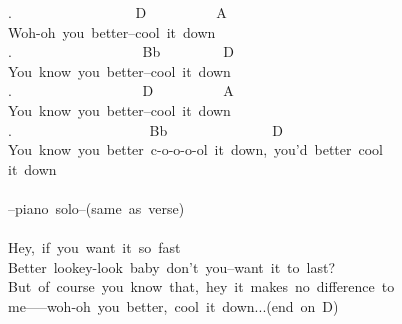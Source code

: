 {. \ \ \ \ \ \ \ \ \ \ \ \ \ \ \ \ \ D\ \ \ \ \ \ \ \ \ \ A\\
Woh-oh\ you\ better--cool\ it\ down\\
. \ \ \ \ \ \ \ \ \ \ \ \ \ \ \ \ \ \ Bb\ \ \ \ \ \ \ \ \ D\\
You\ know\ you\ better--cool\ it\ down\\
. \ \ \ \ \ \ \ \ \ \ \ \ \ \ \ \ \ \ D\ \ \ \ \ \ \ \ \ \ A\ \ \ \ \\
You\ know\ you\ better--cool\ it\ down\\
. \ \ \ \ \ \ \ \ \ \ \ \ \ \ \ \ \ \ \ Bb\ \ \ \ \ \ \ \ \ \ \ \ \ \ \ D\\
You\ know\ you\ better\ c-o-o-o-ol\ it\ down,\ you'd\ better\ cool\ \\
it\ down\\
\\
--piano\ solo--(same\ as\ verse)\\
\\
Hey,\ if\ you\ want\ it\ so\ fast\\
Better\ lookey-look\ baby\ don't\ you--want\ it\ to\ last?\\
But\ of\ course\ you\ know\ that,\ hey\ it\ makes\ no\ difference\ to\ \\
me-----woh-oh\ you\ better,\ cool\ it\ down...(end\ on\ D)\\
\\
\\
}
